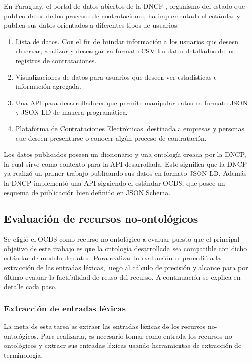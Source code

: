 En Paraguay,  el portal de datos abiertos de la DNCP \cite{DatosAbiDNCP:online}, organismo del estado que publica datos de los procesos de contrataciones, ha implementado el estándar y publica sus datos orientados a diferentes tipos de usuarios:


\begin{enumerate}
    \item Lista de datos. Con el fin de brindar información a los usuarios que deseen observar, analizar y descargar en formato CSV los datos detallados de los registros de contrataciones.
    \item Visualizaciones de datos para usuarios que deseen ver estadísticas e información agregada.
    \item Una API para desarrolladores que permite manipular datos en formato JSON y JSON-LD de manera programática.
    \item Plataforma de Contrataciones Electrónicas, destinada a empresas y personas que deseen presentarse o conocer algún proceso de contratación.
\end{enumerate}

Los datos publicados poseen un diccionario y una ontología creada por la DNCP, la cual sirve como contexto para la API desarrollada. Esto significa que la DNCP ya realizó un primer trabajo publicando sus datos en formato JSON-LD. Además la DNCP implementó una API siguiendo el estándar OCDS, que posee un esquema de publicación bien definido en JSON Schema.


\subsection{Evaluación de recursos no-ontológicos}
Se eligió el OCDS como recurso no-ontológico a evaluar puesto que el principal objetivo de este trabajo es que la ontología desarrollada sea compatible con dicho estándar de modelo de datos. Para realizar la evaluación se procedió a la extracción de las entradas léxicas, luego al cálculo de precisión y alcance para por último evaluar la factibilidad de reuso del recurso.  A continuación se explica en detalle cada paso.

\subsubsection{Extracción de entradas léxicas}
La meta de esta tarea es extraer las entradas léxicas de los recursos no-ontológicos. Para realizarla, es necesario tomar como entrada los recursos no-ontológicos y extraer sus entradas léxicas usando herramientas de extracción de terminología.	
			
